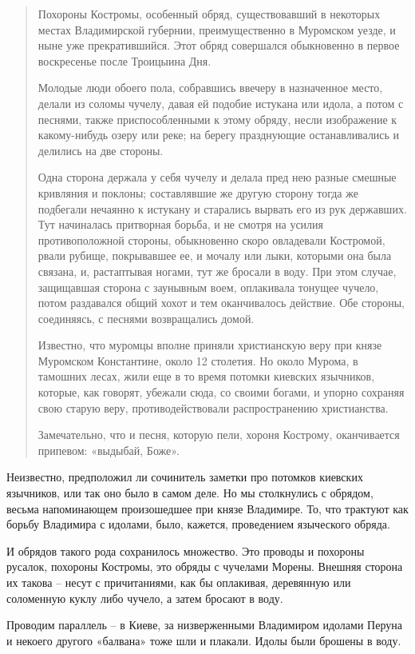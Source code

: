 \begin{quotation}
Похороны Костромы, особенный обряд, существовавший в некоторых местах Владимирской губернии, преимущественно в Муромском уезде, и ныне уже прекратившийся. Этот обряд совершался обыкновенно в первое воскресенье после Троицыина Дня.

   Молодые люди обоего пола, собравшись ввечеру в назначенное место, делали из соломы чучелу, давая ей подобие истукана или идола, а потом с песнями, также приспособленными к этому обряду, несли изображение к какому-нибудь озеру или реке; на берегу празднующие останавливались и делились на две стороны.

   Одна сторона держала у себя чучелу и делала пред нею разные смешные кривляния и поклоны; составлявшие же другую сторону тогда же подбегали нечаянно к истукану и старались вырвать его из рук державших. Тут начиналась притворная борьба, и не смотря на усилия противоположной стороны, обыкновенно скоро овладевали Костромой, рвали рубище, покрывавшее ее, и мочалу или лыки, которыми она была связана, и, растаптывая ногами, тут же бросали в воду. При этом случае, защищавшая сторона с  заунывным воем, оплакивала тонущее чучело, потом раздавался общий хохот и тем оканчивалось действие. Обе стороны, соединяясь, с песнями возвращались домой.

   Известно, что муромцы вполне приняли христианскую веру при князе Муромском Константине, около 12 столетия. Но около Мурома, в тамошних лесах, жили еще в то время потомки киевских язычников, которые, как говорят, убежали сюда, со своими богами, и упорно сохраняя свою старую веру, противодействовали распространению христианства.

   Замечательно, что и песня, которую пели, хороня Кострому, оканчивается припевом: «выдыбай, Боже».
\end{quotation}

   Неизвестно, предположил ли сочинитель заметки про потомков киевских язычников, или так оно было в самом деле. Но мы столкнулись с обрядом, весьма напоминающем произошедшее при князе Владимире. То, что трактуют как борьбу Владимира с идолами, было, кажется, проведением языческого обряда.

   И обрядов такого рода сохранилось множество. Это проводы и похороны русалок, похороны Костромы, это обряды с чучелами Морены. Внешняя сторона их такова – несут с причитаниями, как бы оплакивая, деревянную или соломенную куклу либо чучело, а затем бросают в воду.

   Проводим параллель – в Киеве, за низверженными Владимиром идолами Перуна и некоего другого «балвана» тоже шли и плакали. Идолы были брошены в воду.

